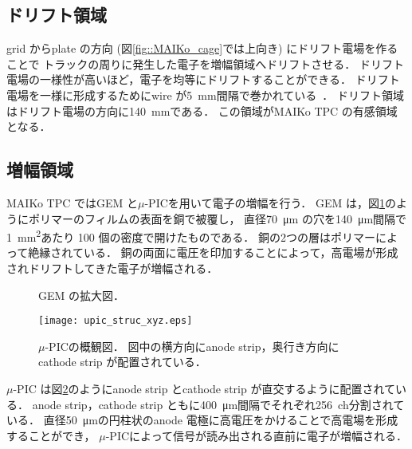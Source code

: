 \documentclass[../master]{subfiles}
\begin{document}

\subsection{ドリフト領域}
grid からplate の方向 (図\ref{fig::MAIKo_cage}では上向き) にドリフト電場を作ることで
トラックの周りに発生した電子を増幅領域へドリフトさせる．
ドリフト電場の一様性が高いほど，電子を均等にドリフトすることができる．
ドリフト電場を一様に形成するためにwire が\SI{5}{\milli\metre}間隔で巻かれている~\cite{furuno}．
ドリフト領域はドリフト電場の方向に\SI{140}{\milli\metre}である．
この領域がMAIKo TPC の有感領域となる．

\subsection{増幅領域}
MAIKo TPC ではGEM と$\mu$-PICを用いて電子の増幅を行う．
GEM は，図\ref{pic::GEM}のようにポリマーのフィルムの表面を銅で被覆し，
直径\SI{70}{\micro\metre} の穴を\SI{140}{\micro\metre}間隔で\SI{1}{\square\milli\metre}あたり
100 個の密度で開けたものである．
銅の2つの層はポリマーによって絶縁されている．
銅の両面に電圧を印加することによって，高電場が形成されドリフトしてきた電子が増幅される．
\begin{figure}
  \centering
  \caption{GEM の拡大図．}
  \label{pic::GEM}  
\end{figure}
\begin{figure}
  \centering
  \texttt{[image: upic\_struc\_xyz.eps]}
  \caption[$\mu$-PICの概観図．]{$\mu$-PICの概観図．
    図中の横方向にanode strip，奥行き方向にcathode strip が配置されている．
  }
  \label{fig::mupic}
\end{figure}
$\mu$-PIC は図\ref{fig::mupic}のようにanode strip とcathode strip が直交するように配置されている．
anode strip，cathode strip ともに\SI{400}{\micro\metre}間隔でそれぞれ256~ch分割されている．
直径\SI{50}{\micro\metre}の円柱状のanode 電極に高電圧をかけることで高電場を形成することができ，
$\mu$-PICによって信号が読み出される直前に電子が増幅される．
\end{document}
